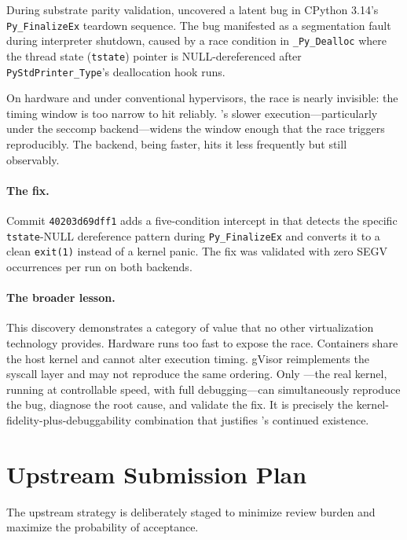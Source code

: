 During substrate parity validation, \UML{} uncovered a latent bug in
CPython 3.14's \texttt{Py\_FinalizeEx} teardown sequence.  The bug
manifested as a segmentation fault during interpreter shutdown, caused
by a race condition in \texttt{\_Py\_Dealloc} where the thread state
(\texttt{tstate}) pointer is NULL-dereferenced after
\texttt{PyStdPrinter\_Type}'s deallocation hook runs.

On hardware and under conventional hypervisors, the race is nearly
invisible: the timing window is too narrow to hit reliably.  \UML{}'s
slower execution---particularly under the seccomp backend---widens
the window enough that the race triggers reproducibly.  The \KVMvTwo{}
backend, being faster, hits it less frequently but still observably.

\paragraph{The fix.}
Commit \texttt{40203d69dff1} adds a five-condition intercept in
 that detects the specific
\texttt{tstate}-NULL dereference pattern during \texttt{Py\_FinalizeEx}
and converts it to a clean \texttt{exit(1)} instead of a kernel
panic.  The fix was validated with zero SEGV occurrences per run on
both backends.

\paragraph{The broader lesson.}
This discovery demonstrates a category of value that no other
virtualization technology provides.  Hardware runs too fast to expose
the race.  Containers share the host kernel and cannot alter execution
timing.  gVisor reimplements the syscall layer and may not reproduce
the same ordering.  Only \UML{}---the real kernel, running at
controllable speed, with full debugging---can simultaneously reproduce
the bug, diagnose the root cause, and validate the fix.  It is
precisely the kernel-fidelity-plus-debuggability combination that
justifies \UML{}'s continued existence.


\section{Upstream Submission Plan}
\label{sec:v2-upstream}

The upstream strategy is deliberately staged to minimize review burden
and maximize the probability of acceptance.


